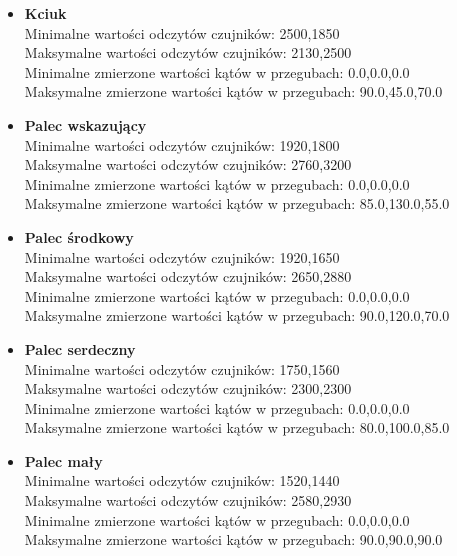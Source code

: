 \documentclass[12pt,a4paper]{article}
\begin{document}
\begin{itemize}
\item \textbf{Kciuk}\\
Minimalne wartości odczytów czujników: 2500,1850\\
Maksymalne wartości odczytów czujników: 2130,2500\\
Minimalne zmierzone wartości kątów w przegubach: 0.0,0.0,0.0\\
Maksymalne zmierzone wartości kątów w przegubach: 90.0,45.0,70.0\\

\item \textbf{Palec wskazujący}\\
Minimalne wartości odczytów czujników: 1920,1800\\
Maksymalne wartości odczytów czujników: 2760,3200\\
Minimalne zmierzone wartości kątów w przegubach: 0.0,0.0,0.0\\
Maksymalne zmierzone wartości kątów w przegubach: 85.0,130.0,55.0\\

\item \textbf{Palec środkowy}\\
Minimalne wartości odczytów czujników: 1920,1650\\
Maksymalne wartości odczytów czujników: 2650,2880\\
Minimalne zmierzone wartości kątów w przegubach: 0.0,0.0,0.0\\
Maksymalne zmierzone wartości kątów w przegubach: 90.0,120.0,70.0\\

\item \textbf{Palec serdeczny}\\
Minimalne wartości odczytów czujników: 1750,1560\\
Maksymalne wartości odczytów czujników: 2300,2300\\
Minimalne zmierzone wartości kątów w przegubach: 0.0,0.0,0.0\\
Maksymalne zmierzone wartości kątów w przegubach: 80.0,100.0,85.0\\

\item \textbf{Palec mały}\\
Minimalne wartości odczytów czujników: 1520,1440\\
Maksymalne wartości odczytów czujników: 2580,2930\\
Minimalne zmierzone wartości kątów w przegubach: 0.0,0.0,0.0\\
Maksymalne zmierzone wartości kątów w przegubach: 90.0,90.0,90.0\\
\end{itemize}
\end{document}

